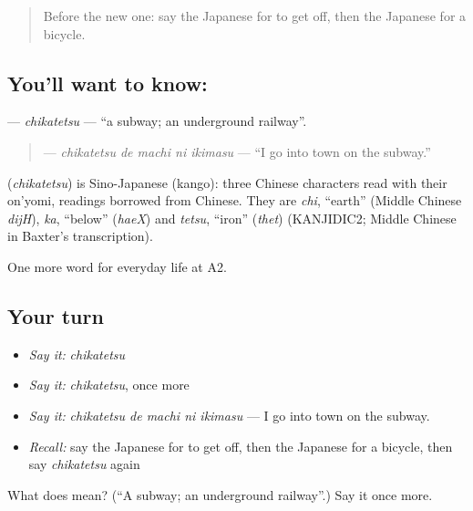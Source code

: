 \begin{quote}
Before the new one: say the Japanese for to get off, then the Japanese for a bicycle.
\end{quote}

\subsection*{You'll want to know: }
\textbf{} — \emph{chikatetsu} — \textquotedblleft{}a subway; an underground railway\textquotedblright{}.

\begin{quote}
\textbf{  } — \emph{chikatetsu de machi ni ikimasu} — \textquotedblleft{}I go into town on the subway.\textquotedblright{}
\end{quote}

\begin{cousinweb}
\textbf{} (\emph{chikatetsu}) is Sino-Japanese (kango): three Chinese characters read with their on'yomi, readings borrowed from Chinese. They are \emph{chi}, \textquotedblleft{}earth\textquotedblright{} (Middle Chinese \emph{dijH}), \emph{ka}, \textquotedblleft{}below\textquotedblright{} (\emph{haeX}) and \emph{tetsu}, \textquotedblleft{}iron\textquotedblright{} (\emph{thet}) (KANJIDIC2; Middle Chinese in Baxter's transcription).
\end{cousinweb}

\begin{grammarlens}[title={What you've built}]
One more word for everyday life at A2.
\end{grammarlens}

\subsection*{Your turn}
\begin{itemize}
\raggedright
  \item \emph{Say it:} \emph{chikatetsu}
  \item \emph{Say it:} \emph{chikatetsu}, once more
  \item \emph{Say it:} \emph{chikatetsu de machi ni ikimasu} — I go into town on the subway.
  \item \emph{Recall:} say the Japanese for to get off, then the Japanese for a bicycle, then say \emph{chikatetsu} again
\end{itemize}

\begin{tcolorbox}[breakable,colback=teal!4,colframe=teal!35!black,title={Before you move on}]
What does  mean? (\textquotedblleft{}A subway; an underground railway\textquotedblright{}.) Say it once more.
\end{tcolorbox}
